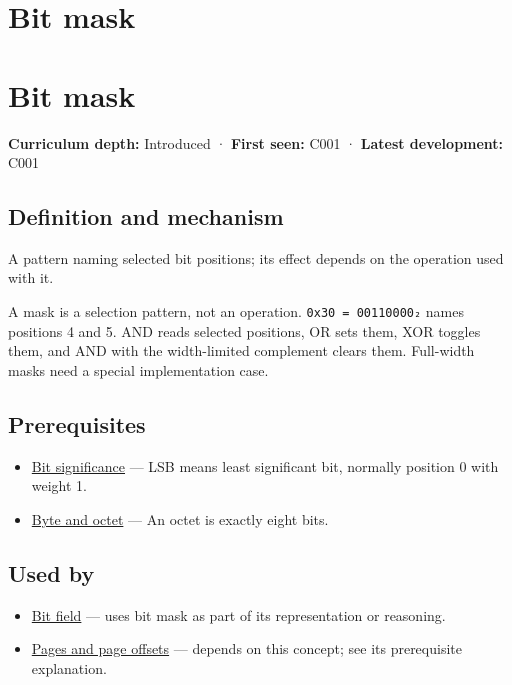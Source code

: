 \hypertarget{appendix-dbe5905163c2}{}
\section*{Bit mask}
\section{Bit mask}\label{appendix-dbe5905163c2-bit-mask}

\textbf{Curriculum depth:} Introduced · \textbf{First seen:} C001 · \textbf{Latest development:} C001

\subsection{Definition and mechanism}\label{appendix-dbe5905163c2-definition-and-mechanism}

A pattern naming selected bit positions; its effect depends on the operation used with it.

A mask is a selection pattern, not an operation. \texttt{0x30\ =\ 00110000₂} names positions 4 and 5. AND reads selected positions, OR sets them, XOR toggles them, and AND with the width-limited complement clears them. Full-width masks need a special implementation case.

\subsection{Prerequisites}\label{appendix-dbe5905163c2-prerequisites}

\begin{itemize}
\tightlist
\item
  \hyperref[appendix-280445746493]{Bit significance} --- LSB means least significant bit, normally position 0 with weight 1.
\item
  \hyperref[appendix-5bee2df85484]{Byte and octet} --- An octet is exactly eight bits.
\end{itemize}

\subsection{Used by}\label{appendix-dbe5905163c2-used-by}

\begin{itemize}
\item
  \hyperref[appendix-ac697f5c66e8]{Bit field} --- uses bit mask as part of its representation or reasoning.
\item
  \hyperref[appendix-0c67cd5bf30a]{Pages and page offsets} --- depends on this concept; see its prerequisite explanation.
\end{itemize}

